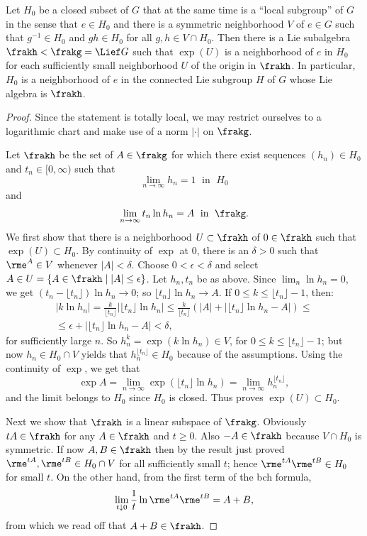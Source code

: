 \begin{thm}[{{\cite[Thm~1.10.6]{DK}}}]\label{thm 1.10.6 DK}
    Let $H_0$ be a closed subset of $G$ that at the same time is a ``local subgroup'' of $G$ in the sense that $e\in H_0$ and there is a symmetric neighborhood $V$ of $e\in G$ such that $g^{-1}\in H_0$ and $gh\in H_0$ for all $g,h\in V\cap H_0$. Then there is a Lie subalgebra $\frakh<\frakg=\Lief G$ such that $\exp(U)$ is a neighborhood of $e$ in $H_0$ for each sufficiently small neighborhood $U$ of the origin in $\frakh$. In particular, $H_0$ is a neighborhood of $e$ in the connected Lie subgroup $H$ of $G$ whose Lie algebra is $\frakh$.
\end{thm}
\begin{proof}
    Since the statement is totally local, we may restrict ourselves to a logarithmic chart and make use of a norm $|\cdot |$ on $\frakg$.

    Let $\frakh$ be the set of $A\in\frakg$ for which there exist sequences $(h_n)\in H_0$ and $t_n\in[0,\infty)$ such that 
    \[\lim_{n\to\infty} h_n=1\;\text{ in }\;H_0\] and 
    \[\lim_{n\to\infty} t_n \ln h_n=A\;\text{ in }\;\frakg.\]
    We first show that there is a neighborhood $U\subset \frakh$ of $0\in\frakh$ such that $\exp(U)\subset H_0$. By continuity of $\exp$ at $0$, there is an $\delta>0$ such that $\rme^A\in V$ whenever $|A|<\delta$. Choose $0<\epsilon<\delta$ and select $A\in U=\{A\in\frakh\mid |A|\leq \epsilon\}$. Let $h_n,t_n$ be as above. Since $\lim_n \ln h_n=0$, we get $(t_n-\lfloor t_n\rfloor)\ln h_n\to 0$; so $\lfloor t_n\rfloor \ln h_n\to A$. If $0\leq k\leq \lfloor t_n\rfloor -1$, then:
    \begin{multline}
        \left|k\ln h_n\right|=\frac{k}{\lfloor t_n\rfloor}|\lfloor t_n\rfloor \ln h_n|\leq 
    \frac{k}{\lfloor t_n\rfloor}\left(|A|+\left|\lfloor t_n\rfloor \ln h_n-A\right|\right)\leq \\
    \leq \epsilon+\left|\lfloor t_n\rfloor \ln h_n-A\right|<\delta,
    \end{multline}
    for sufficiently large $n$. So $h_n^k=\exp(k\ln h_n)\in V$, for $0\leq k\leq \lfloor t_n\rfloor -1$; but now $h_n\in H_0\cap V$ yields that $h_n^{\lfloor t_n\rfloor}\in H_0$ because of the assumptions. Using the continuity of $\exp$, we get that
    \[\exp A=\lim_{n\to \infty}\exp\left(\lfloor t_n\rfloor \ln h_n\right)=\lim_{n\to\infty} h_n^{\lfloor t_n\rfloor},\]
    and the limit belongs to $H_0$ since $H_0$ is closed. Thus proves $\exp(U)\subset H_0$.

    Next we show that $\frakh$ is a linear subspace of $\frakg$. Obviously $tA\in\frakh$ for any $A\in\frakh$ and $t\geq 0$. Also $-A\in\frakh$ because $V\cap H_0$ is symmetric. If now $A,B\in\frakh$ then by the result just proved $\rme^{tA},\rme^{tB}\in H_0\cap V$ for all sufficiently small $t$; hence $\rme^{tA}\rme^{tB}\in H_0$ for small $t$. On the other hand, from the first term of the \gls{bch} formula,
    \[\lim_{t\downarrow 0}\frac{1}{t} \ln \rme^{tA}\rme^{tB}=A+B,\]
    from which we read off that $A+B\in\frakh$.


\end{proof}
